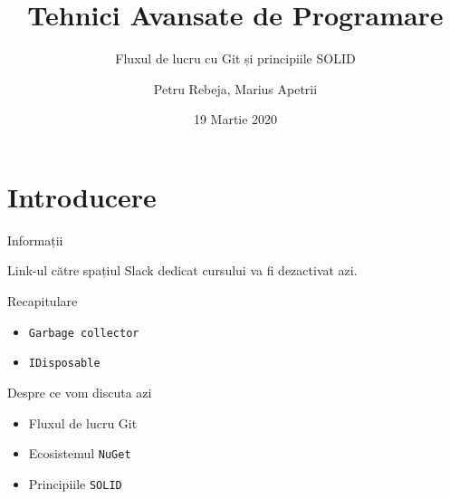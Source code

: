 \documentclass[presentation]{beamer}
\author{Petru Rebeja, Marius Apetrii}
\date{19 Martie 2020}
\title{Tehnici Avansate de Programare}
\subtitle{Fluxul de lucru cu Git și principiile SOLID}
\institute[UAIC]{Facultatea de Matematică\\Universitatea Alexandru Ioan Cuza, Iași}
\begin{document}
\maketitle
\section{Introducere}
\label{sec:org1cca4fe}
\begin{frame}[label={sec:org34ecb77}]{Informații}
\begin{center}
Link-ul către spațiul Slack dedicat cursului va fi dezactivat azi.
\end{center}
\end{frame}
\begin{frame}[label={sec:org1e7e04b},fragile]{Recapitulare}
 \begin{itemize}
\item \texttt{Garbage collector}
\item \texttt{IDisposable}
\end{itemize}
\end{frame}
\begin{frame}[label={sec:org658104d},fragile]{Despre ce vom discuta azi}
 \begin{itemize}
\item Fluxul de lucru Git
\item Ecosistemul \texttt{NuGet}
\item Principiile \texttt{SOLID}
\end{itemize}
\end{frame}
\end{document}
